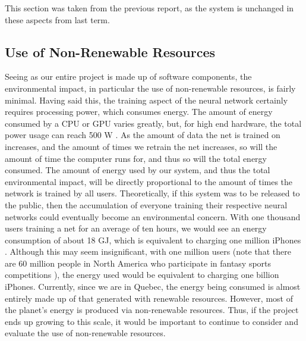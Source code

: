 This section was taken from the previous report, as the system is unchanged in these aspects from last term.

\subsection{Use of Non-Renewable Resources}
Seeing as our entire project is made up of software components, the environmental impact, in particular the use of non-renewable resources, is fairly minimal. Having said this, the training aspect of the neural network certainly requires processing power, which consumes energy. The amount of energy consumed by a CPU or GPU varies greatly, but, for high end hardware, the total power usage can reach 500 W \cite{GPU}. As the amount of data the net is trained on increases, and the amount of times we retrain the net increases, so will the amount of time the computer runs for, and thus so will the total energy consumed. The amount of energy used by our system, and thus the total environmental impact, will be directly proportional to the amount of times the network is trained by all users. Theoretically, if this system was to be released to the public, then the accumulation of everyone training their respective neural networks could eventually become an environmental concern. With one thousand users training a net for an average of ten hours, we would see an energy consumption of about 18 GJ, which is equivalent to charging one million iPhones \cite{iphone}. Although this may seem insignificant, with one million users (note that there are 60 million people in North America who participate in fantasy sports competitions %
), the energy used would be equivalent to charging one billion iPhones. Currently, since we are in Quebec, the energy being consumed is almost entirely made up of that generated with renewable resources. However, most of the planet's energy is produced via non-renewable resources\cite{energy}. Thus, if the project ends up growing to this scale, it would be important to continue to consider and evaluate the use of non-renewable resources.


